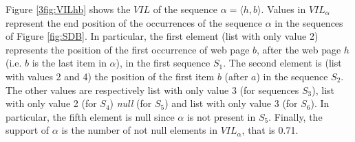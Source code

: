 \begin{example}
\label{ex:vil}
Figure \ref{3fig:VILhb} shows the $VIL$ of the sequence $\alpha = \langle h , b \rangle$. Values in $VIL_{\alpha}$ represent the end position of the occurrences of the sequence $\alpha$ in the sequences of Figure \ref{fig:SDB}. In particular, the first element (list with only value 2) represents the position of the first occurrence of web page $b$, after the web page $h$ (i.e. $b$ is the last item in $\alpha$), in the first sequence $S_1$. The second element is (list with values 2 and 4) the position of the first item $b$ (after $a$) in the sequence $S_2$.
The other values are respectively list with only value 3 (for sequences $S_3$), list with only value  2 (for $S_4$) \emph{null} (for $S_5$) and list with only value 3 (for $S_6$).  In particular, the fifth element is null since $\alpha$ is not present in $S_5$.
Finally, the support of $\alpha$ is the number of not null elements in $VIL_{\alpha}$, that is 0.71.
\end{example}
